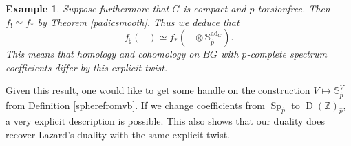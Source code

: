 \documentclass[12pt]{article}
\newtheorem{example}[theorem]{Example}
\newcommand{\on}{\operatorname}
\newcommand{\mbb}{\mathbb}
\newcommand{\wh}{\widehat}
\begin{document}
\begin{example}
Suppose furthermore that $G$ is compact and $p$-torsionfree.  Then $f_!\simeq f_\ast$ by Theorem \ref{padicsmooth}.  Thus we deduce that
$$f_\natural(-) \simeq f_\ast(-\otimes \mathbb{S}_{\wh{p}}^{\on{ad}_G}).$$
This means that homology and cohomology on $BG$ with $p$-complete spectrum coefficients differ by this explicit twist.
\end{example}

Given this result, one would like to get some handle on the construction $V\mapsto \mbb{S}_{\wh{p}}^V$ from Definition \ref{spherefromvb}.  If we change coefficients from $\on{Sp}_{\wh{p}}$ to $\on{D}(\mbb{Z})_{\wh{p}}$, a very explicit description is possible.  This also shows that our duality does recover Lazard's duality with the same explicit twist.
\end{document}

